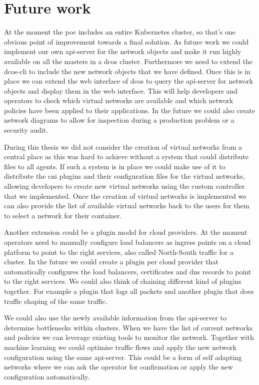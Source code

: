 \chapter{Future work}
\label{chap:future-work}
At the moment the \gls{poc} includes an entire Kubernetes cluster, so that's one obvious point of improvement towards a final solution. As future work we could implement our own api-server for the network objects and make it run highly available on all the masters in a \gls{dcos} cluster. Furthermore we need to extend the dcos-cli to include the new network objects that we have defined. Once this is in place we can extend the web interface of \gls{dcos} to query the api-server for network objects and display them in the web interface. This will help developers and operators to check which virtual networks are available and which network policies have been applied to their applications. In the future we could also create network diagrams to allow for inspection during a production problem or a security audit.

During this thesis we did not consider the creation of virtual networks from a central place as this was hard to achieve without a system that could distribute files to all agents. If such a system is in place we could make use of it to distribute the \gls{cni} plugins and their configuration files for the virtual networks, allowing developers to create new virtual networks using the custom controller that we implemented. Once the creation of virtual networks is implemented we can also provide the list of available virtual networks back to the users for them to select a network for their container.

Another extension could be a plugin model for cloud providers. At the moment operators need to manually configure load balancers as ingress points on a cloud platform to point to the right services, also called North-South traffic for a cluster. In the future we could create a plugin per cloud provider that automatically configures the load balancers, certificates and \gls{dns} records to point to the right services. We could also think of chaining different kind of plugins together. For example a plugin that logs all packets and another plugin that does traffic shaping of the same traffic.

We could also use the newly available information from the api-server to determine bottlenecks within clusters. When we have the list of current networks and policies we can leverage existing tools to monitor the network. Together with machine learning we could optimise traffic flows and apply the new network configuration using the same api-server. This could be a form of self adapting networks where we can ask the operator for confirmation or apply the new configuration automatically.

